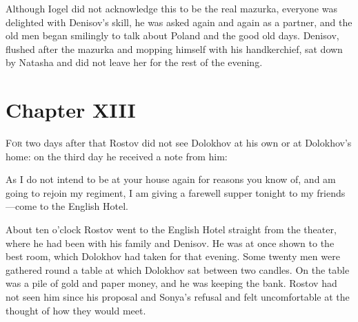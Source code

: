 Although Iogel did not acknowledge this to be the real mazurka,
everyone was delighted with Denisov's skill, he was asked again
and again as a partner, and the old men began smilingly to talk
about Poland and the good old days. Denisov, flushed after the
mazurka and mopping himself with his handkerchief, sat down by
Natasha and did not leave her for the rest of the evening.


\chapter*{Chapter XIII}
\ifaudio     
{} 
\fi

\lettrine[lines=2, loversize=0.3, lraise=0]{\initfamily F}{or}
two days after that Rostov did not see Dolokhov at his own or
at Dolokhov's home: on the third day he received a note from him:

As I do not intend to be at your house again for reasons you know
of, and am going to rejoin my regiment, I am giving a farewell
supper tonight to my friends---come to the English Hotel.

About ten o'clock Rostov went to the English Hotel straight from
the theater, where he had been with his family and Denisov. He
was at once shown to the best room, which Dolokhov had taken for
that evening. Some twenty men were gathered round a table at
which Dolokhov sat between two candles. On the table was a pile
of gold and paper money, and he was keeping the bank. Rostov had
not seen him since his proposal and Sonya's refusal and felt
uncomfortable at the thought of how they would meet.

